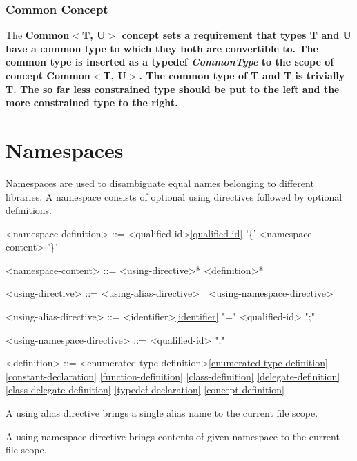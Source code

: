 \documentclass[a4paper,oneside,11pt]{article}
\begin{document}
\subsubsection{Common Concept}

The \bf{Common$<$T, U$>$} concept sets a requirement that types T and U have a common type to which they both are convertible to. The common type is inserted as a typedef \emph{CommonType} to the scope of concept \bf{Common$<$T, U$>$}. The common type of T and T is trivially T.
The so far less constrained type should be put to the left and the more constrained type to the right.

\section{Namespaces}

Namespaces are used to disambiguate equal names belonging to different libraries.
A namespace consists of optional using directives followed by optional definitions.

\begin{grammar}
\label{namespace-definition}<namespace-definition> ::=  <qualified-id>\ref{qualified-id} '\{' <namespace-content> '\}'

\label{namespace-content}<namespace-content> ::= <using-directive>* <definition>*

<using-directive> ::= <using-alias-directive> | <using-namespace-directive>

<using-alias-directive> ::=  <identifier>\ref{identifier} "=" <qualified-id> ";"

<using-namespace-directive> ::=  <qualified-id> ";"

<definition> ::= <enumerated-type-definition>\ref{enumerated-type-definition}
\ref{constant-declaration}
\ref{function-definition}
\ref{class-definition}
\ref{delegate-definition}
\ref{class-delegate-definition}
\ref{typedef-declaration}
\ref{concept-definition}
\end{grammar}

A using alias directive brings a single alias name to the current file scope.

A using namespace directive brings contents of given namespace to the current file scope.
\end{document}
